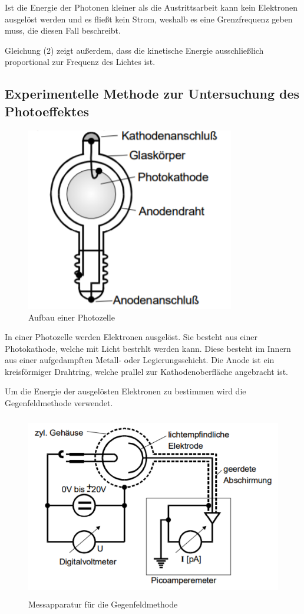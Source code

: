 Ist die Energie der Photonen kleiner als die Austrittsarbeit kann kein Elektronen ausgelöst werden und
es fließt kein Strom, weshalb es eine Grenzfrequenz geben muss, die diesen Fall beschreibt.

Gleichung (2) zeigt außerdem, dass die kinetische Energie ausschließlich proportional zur Frequenz des Lichtes ist.

\subsection{Experimentelle Methode zur Untersuchung des Photoeffektes}

\begin{figure}[H]
  \centering
  \includegraphics[height=8cm]{photozelle.PNG}
  \caption{Aufbau einer Photozelle}
  \label{fig:kathode}
\end{figure}

In einer Photozelle werden Elektronen ausgelöst. Sie besteht aus einer Photokathode, welche mit Licht bestrhlt werden kann.
Diese besteht im Innern aus einer aufgedampften Metall- oder Legierungsschicht.
Die Anode ist ein kreisförmiger Drahtring, welche prallel zur Kathodenoberfläche angebracht ist.

Um die Energie der ausgelösten Elektronen zu bestimmen wird die Gegenfeldmethode verwendet.


\begin{figure}[H]
  \centering
  \includegraphics[height=8cm]{gegenfeld.PNG}
  \caption{Messapparatur für die Gegenfeldmethode}
  \label{fig:kathode}
\end{figure}

